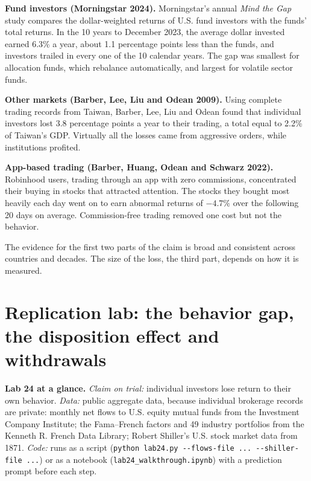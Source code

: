 \textbf{Fund investors (Morningstar 2024).} Morningstar's annual \emph{Mind the Gap} study compares the dollar-weighted returns of U.S. fund investors with the funds' total returns. In the 10 years to December 2023, the average dollar invested earned 6.3\% a year, about 1.1 percentage points less than the funds, and investors trailed in every one of the 10 calendar years. The gap was smallest for allocation funds, which rebalance automatically, and largest for volatile sector funds.

\textbf{Other markets (Barber, Lee, Liu and Odean 2009).} Using complete trading records from Taiwan, Barber, Lee, Liu and Odean found that individual investors lost 3.8 percentage points a year to their trading, a total equal to 2.2\% of Taiwan's GDP. Virtually all the losses came from aggressive orders, while institutions profited.

\textbf{App-based trading (Barber, Huang, Odean and Schwarz 2022).} Robinhood users, trading through an app with zero commissions, concentrated their buying in stocks that attracted attention. The stocks they bought most heavily each day went on to earn abnormal returns of $-4.7\%$ over the following 20 days on average. Commission-free trading removed one cost but not the behavior.

The evidence for the first two parts of the claim is broad and consistent across countries and decades. The size of the loss, the third part, depends on how it is measured.

\section{Replication lab: the behavior gap, the disposition effect and withdrawals}
\label{sec:24-lab}

\begin{callout}
\textbf{Lab 24 at a glance.} \emph{Claim on trial:} individual investors lose return to their own behavior. \emph{Data:} public aggregate data, because individual brokerage records are private: monthly net flows to U.S. equity mutual funds from the Investment Company Institute; the Fama--French factors and 49 industry portfolios from the Kenneth R. French Data Library; Robert Shiller's U.S. stock market data from 1871. \emph{Code:} runs as a script (\texttt{python lab24.py -{}-flows-file ... -{}-shiller-file ...}) or as a notebook (\texttt{lab24\_walkthrough.ipynb}) with a prediction prompt before each step.
\end{callout}

